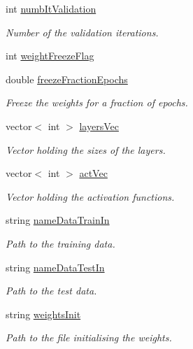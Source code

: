 \begin{DoxyCompactItemize}
int \hyperlink{classParamsInit_a4d892718b54db6189abe285406e49972}{numb\+It\+Validation}
\begin{DoxyCompactList}\small\item\em Number of the validation iterations. \end{DoxyCompactList}\item 
int \hyperlink{classParamsInit_aac355778c92c0ea796fc29d329809624}{weight\+Freeze\+Flag}
\item 
double \hyperlink{classParamsInit_a57741539dedc3c7d0ca48096076e12f2}{freeze\+Fraction\+Epochs}
\begin{DoxyCompactList}\small\item\em Freeze the weights for a fraction of epochs. \end{DoxyCompactList}\item 
vector$<$ int $>$ \hyperlink{classParamsInit_aeee8365494660fa642a057d5497d46e1}{layers\+Vec}
\begin{DoxyCompactList}\small\item\em Vector holding the sizes of the layers. \end{DoxyCompactList}\item 
vector$<$ int $>$ \hyperlink{classParamsInit_aa95e42f8c7f50d5ed9186dd2cb4f07aa}{act\+Vec}
\begin{DoxyCompactList}\small\item\em Vector holding the activation functions. \end{DoxyCompactList}\item 
string \hyperlink{classParamsInit_a8ccf3dc572e5db746f8f8f865f58cfea}{name\+Data\+Train\+In}
\begin{DoxyCompactList}\small\item\em Path to the training data. \end{DoxyCompactList}\item 
string \hyperlink{classParamsInit_a767cac558a94a14a9b4ea3fc5693747c}{name\+Data\+Test\+In}
\begin{DoxyCompactList}\small\item\em Path to the test data. \end{DoxyCompactList}\item 
string \hyperlink{classParamsInit_a88906d27914ea5df98f5f997de2f3b0a}{weights\+Init}
\begin{DoxyCompactList}\small\item\em Path to the file initialising the weights. \end{DoxyCompactList}\item 

\end{DoxyCompactItemize}
